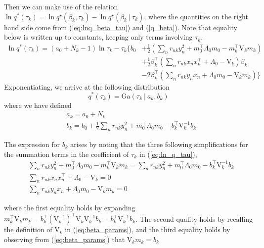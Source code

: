 \documentclass[twoside,11pt]{article}
\newcommand\given[1][]{\:#1\vert\:}
\newcommand{\transpose}[1]{#1^{\intercal}}
\begin{document}
Then we can make use of the relation $\ln q^{*}(\tau_k) = \ln q^{\star}(\beta_k, \tau_k) -  \ln q^{\star}(\beta_k \given \tau_k)$, where the quantities on the right hand side come from (\ref{eq:lnq_beta_tau}) and (\ref{q_beta}). Note that equality below is written up to constants, keeping only terms involving $\tau_k$. 
\begin{equation}\label{eq:ln_q_tau}
\begin{split}
	 \ln q^{*}(\tau_k) = (a_0 + N_k - 1) \ln \tau_k - \tau_k \Bigg\{ b_0 & + \frac{1}{2} \left( \sum_{n}r_{nk}y_n^2 + \transpose{m_0} \Lambda_0 m_0 - \transpose{m_k} \mathrm{V}_k m_k \right) \\
	 & + \frac{1}{2} \transpose{\beta_k} \left( \sum_{n} r_{nk} x_n \transpose{x_n} + \Lambda_0 - \mathrm{V}_k \right) \beta_k \\
	 & - 2 \transpose{\beta_k} \left( \sum_{n} r_{nk} y_n x_n + \Lambda_0 m_0 - \mathrm{V}_k m_k \right) \Bigg\}
\end{split}
\end{equation}
Exponentiating, we arrive at the following distribution
\begin{equation} \label{eq:q_tau}
	q^{*}(\tau_k) =  \mathrm{Ga}\left( \tau_k \given a_k, b_k \right)
\end{equation}
where we have defined
\begin{equation} \label{eq:tau_params}
\begin{split}
	& a_k = a_0 + N_k \\
	& b_k = b_0 + \frac{1}{2} \sum_{n} r_{nk} y_n^2 + \transpose{m_0} \Lambda_0 m_0 - \transpose{b_k} \mathrm{V}_k^{-1} b_k
\end{split}
\end{equation}

The expression for $b_k$ arises by noting that the three following simplifications for the summation terms in the coefficient of $\tau_k$ in (\ref{eq:ln_q_tau}), 
\begin{align*}
	& \sum_{n}r_{nk}y_n^2 + \transpose{m_0} \Lambda_0 m_0 - \transpose{m_k} \mathrm{V}_k m_k =  \sum_{n}r_{nk}y_n^2 + \transpose{m_0} \Lambda_0 m_0 -\transpose{b_k} \mathrm{V}_k^{-1} b_k \\
	& \sum_{n} r_{nk} x_n \transpose{x_n} + \Lambda_0 - \mathrm{V}_k = 0 \\
	& \sum_{n} r_{nk} y_n x_n + \Lambda_0 m_0 - \mathrm{V}_k m_k = 0
\end{align*}

where the first equality holds by expanding $\transpose{m_k} \mathrm{V}_k m_k = \transpose{b_k} \left( \mathrm{V}_k^{-1}\right)^{\intercal} \mathrm{V}_k \mathrm{V}_k^{-1} b_k = \transpose{b_k} \mathrm{V}_k^{-1} b_k$. The second quality holds by recalling the definition of $\mathrm{V}_k$ in (\ref{eq:beta_params}), and the third equality holds by observing from (\ref{eq:beta_params}) that $\mathrm{V}_{k} m_k = b_k$

\section{ } %




\vskip 0.2in

\end{document}
